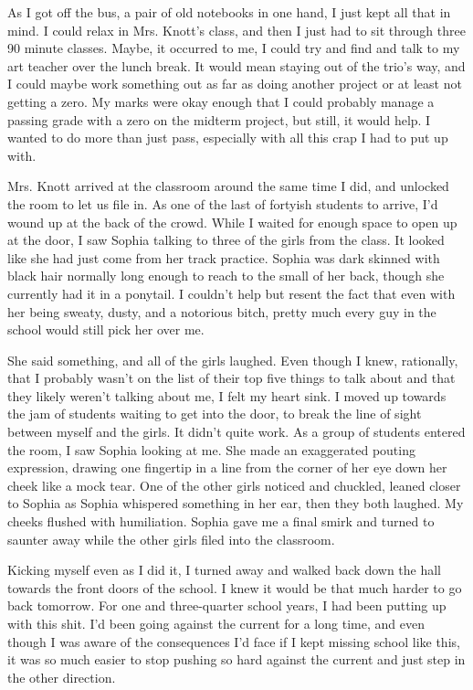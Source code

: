 As I got off the bus, a pair of old notebooks in one hand, I just kept all that in mind. I could relax in Mrs. Knott's class, and then I just had to sit through three 90 minute classes. Maybe, it occurred to me, I could try and find and talk to my art teacher over the lunch break. It would mean staying out of the trio's way, and I could maybe work something out as far as doing another project or at least not getting a zero. My marks were okay enough that I could probably manage a passing grade with a zero on the midterm project, but still, it would help. I wanted to do more than just pass, especially with all this crap I had to put up with.

Mrs. Knott arrived at the classroom around the same time I did, and unlocked the room to let us file in. As one of the last of fortyish students to arrive, I'd wound up at the back of the crowd. While I waited for enough space to open up at the door, I saw Sophia talking to three of the girls from the class. It looked like she had just come from her track practice. Sophia was dark skinned with black hair normally long enough to reach to the small of her back, though she currently had it in a ponytail. I couldn't help but resent the fact that even with her being sweaty, dusty, and a notorious bitch, pretty much every guy in the school would still pick her over me.

She said something, and all of the girls laughed. Even though I knew, rationally, that I probably wasn't on the list of their top five things to talk about and that they likely weren't talking about me, I felt my heart sink. I moved up towards the jam of students waiting to get into the door, to break the line of sight between myself and the girls. It didn't quite work. As a group of students entered the room, I saw Sophia looking at me. She made an exaggerated pouting expression, drawing one fingertip in a line from the corner of her eye down her cheek like a mock tear. One of the other girls noticed and chuckled, leaned closer to Sophia as Sophia whispered something in her ear, then they both laughed. My cheeks flushed with humiliation. Sophia gave me a final smirk and turned to saunter away while the other girls filed into the classroom.

Kicking myself even as I did it, I turned away and walked back down the hall towards the front doors of the school. I knew it would be that much harder to go back tomorrow. For one and three-quarter school years, I had been putting up with this shit. I'd been going against the current for a long time, and even though I was aware of the consequences I'd face if I kept missing school like this, it was so much easier to stop pushing so hard against the current and just step in the other direction.

